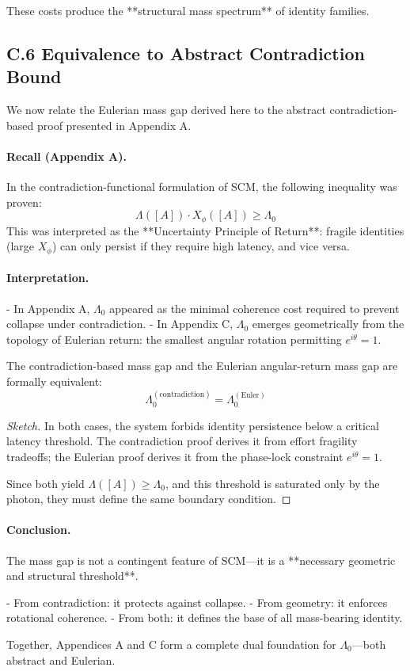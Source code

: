 These costs produce the **structural mass spectrum** of identity families.

\subsection*{C.6 \quad Equivalence to Abstract Contradiction Bound}
\label{sec:c6-equivalence-abstract}

We now relate the Eulerian mass gap derived here to the abstract contradiction-based proof presented in Appendix A.

\paragraph{Recall (Appendix A).}
In the contradiction-functional formulation of SCM, the following inequality was proven:
\[
\Lambda([A]) \cdot X_\phi([A]) \geq \Lambda_0
\]
This was interpreted as the **Uncertainty Principle of Return**: fragile identities (large $X_\phi$) can only persist if they require high latency, and vice versa.

\paragraph{Interpretation.}
- In Appendix A, $\Lambda_0$ appeared as the minimal coherence cost required to prevent collapse under contradiction.
- In Appendix C, $\Lambda_0$ emerges geometrically from the topology of Eulerian return: the smallest angular rotation permitting $e^{i\theta} = 1$.

\begin{proposition}
The contradiction-based mass gap and the Eulerian angular-return mass gap are formally equivalent:
\[
\Lambda_0^{(\text{contradiction})} = \Lambda_0^{(\text{Euler})}
\]
\end{proposition}

\begin{proof}[Sketch]
In both cases, the system forbids identity persistence below a critical latency threshold. The contradiction proof derives it from effort fragility tradeoffs; the Eulerian proof derives it from the phase-lock constraint $e^{i\theta} = 1$.

Since both yield $\Lambda([A]) \geq \Lambda_0$, and this threshold is saturated only by the photon, they must define the same boundary condition.

\end{proof}

\paragraph{Conclusion.}
The mass gap is not a contingent feature of SCM—it is a **necessary geometric and structural threshold**.

- From contradiction: it protects against collapse.
- From geometry: it enforces rotational coherence.
- From both: it defines the base of all mass-bearing identity.

Together, Appendices A and C form a complete dual foundation for $\Lambda_0$—both abstract and Eulerian.
